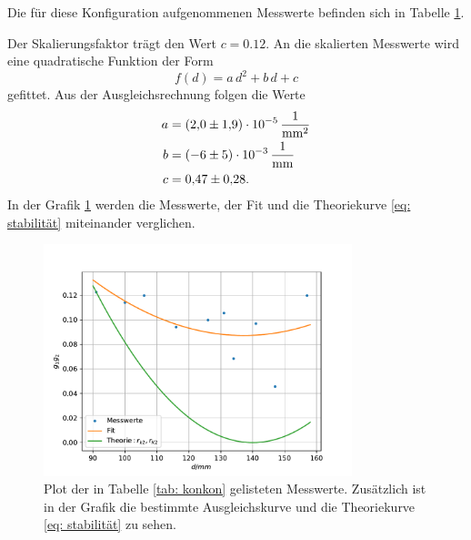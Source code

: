 Die für diese Konfiguration aufgenommenen Messwerte befinden sich in Tabelle \ref{fig: konkon}.

Der Skalierungsfaktor trägt den Wert $c=\num{0.12}$.
An die skalierten Messwerte wird eine quadratische Funktion der Form
\begin{equation*}
  f(d)=a\,d^2+b\,d+c
\end{equation*}
gefittet. Aus der Ausgleichsrechnung folgen die Werte
\begin{align}
  \label{eq: fit_konkon}
  \begin{aligned}
    a&=\SI{2.0\pm 1.9 e-5}{\per\square\milli\meter}\\
    b&=\SI{-6\pm5 e-3}{\per\milli\meter}\\
    c&=\num{0.47\pm0.28}.
  \end{aligned}
\end{align}
In der Grafik \ref{fig: konkon} werden die Messwerte, der Fit und die Theoriekurve \eqref{eq: stabilität} miteinander verglichen. %

\begin{figure}[h!]
  \centering
  \includegraphics[width=0.8\textwidth]{../Messdaten/plots/konkon.pdf}
  \caption{Plot der in Tabelle \ref{tab: konkon} gelisteten Messwerte. Zusätzlich ist in der Grafik die bestimmte Ausgleichskurve und die Theoriekurve \eqref{eq: stabilität} zu sehen.} %
  \label{fig: konkon}
\end{figure}

\FloatBarrier
\FloatBarrier
